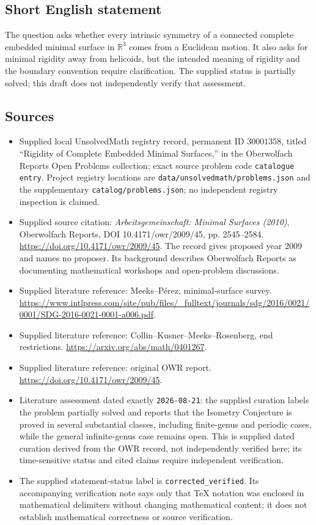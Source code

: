 \documentclass[11pt]{article}
\newcommand{\R}{\mathbb{R}}
\begin{document}
\subsection{Short English statement}
The question asks whether every intrinsic symmetry of a connected complete embedded minimal surface in \(\R^3\) comes from a Euclidean motion. It also asks for minimal rigidity away from helicoids, but the intended meaning of rigidity and the boundary convention require clarification. The supplied status is partially solved; this draft does not independently verify that assessment.
\subsection{Sources}
\begin{itemize}
\item Supplied local UnsolvedMath registry record, permanent ID \(30001358\), titled ``Rigidity of Complete Embedded Minimal Surfaces,'' in the Oberwolfach Reports Open Problems collection; exact source problem code \texttt{catalogue entry}. Project registry locations are \texttt{data/unsolvedmath/problems.json} and the supplementary \texttt{catalog/problems.json}; no independent registry inspection is claimed.
\item Supplied source citation: \emph{Arbeitsgemeinschaft: Minimal Surfaces (2010)}, Oberwolfach Reports, DOI 10.4171/owr/2009/45, pp. 2545--2584. \url{https://doi.org/10.4171/owr/2009/45}. The record gives proposed year 2009 and names no proposer. Its background describes Oberwolfach Reports as documenting mathematical workshops and open-problem discussions.
\item Supplied literature reference: Meeks--P\'erez, minimal-surface survey. \url{https://www.intlpress.com/site/pub/files/_fulltext/journals/sdg/2016/0021/0001/SDG-2016-0021-0001-a006.pdf}.
\item Supplied literature reference: Collin--Kusner--Meeks--Rosenberg, end restrictions. \url{https://arxiv.org/abs/math/0401267}.
\item Supplied literature reference: original OWR report. \url{https://doi.org/10.4171/owr/2009/45}.
\item Literature assessment dated exactly \texttt{2026-08-21}: the supplied curation labels the problem partially solved and reports that the Isometry Conjecture is proved in several substantial classes, including finite-genus and periodic cases, while the general infinite-genus case remains open. This is supplied dated curation derived from the OWR record, not independently verified here; its time-sensitive status and cited claims require independent verification.
\item The supplied statement-status label is \texttt{corrected\_verified}. Its accompanying verification note says only that TeX notation was enclosed in mathematical delimiters without changing mathematical content; it does not establish mathematical correctness or source verification.
\end{itemize}
\end{document}
